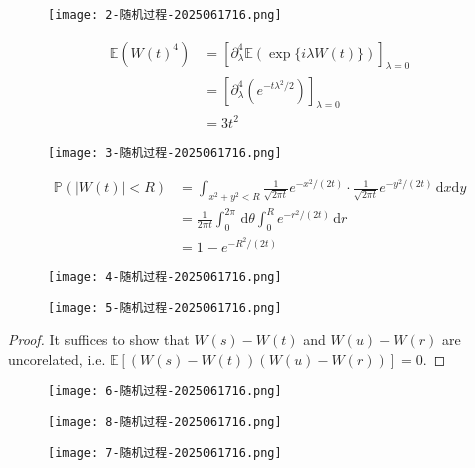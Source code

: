 \begin{figure}[H]
\centering
\texttt{[image: 2-随机过程-2025061716.png]}
\label{}
\end{figure}
\[
\begin{aligned}
\mathbb{E}(W(t)^{4}) & =[\partial^{4}_{\lambda}\mathbb{E}(\exp \{ i\lambda W(t) \})]_{\lambda=0} \\
 & =[\partial^{4}_{\lambda}(e^{ -t\lambda^{2}/2  }) ]_{\lambda=0} \\
 & =3 t^2
\end{aligned}
\]
\begin{figure}[H]
\centering
\texttt{[image: 3-随机过程-2025061716.png]}
\label{}
\end{figure}
\[
\begin{aligned}
\mathbb{P}(\lvert W(t) \rvert <R) & =\int_{x^{2}+y^{2}<R}^{} \frac{1}{\sqrt{ 2\pi t }}e^{ -x^{2}/(2t) }\cdot\frac{1}{\sqrt{ 2\pi t }}e^{ -y^{2}/(2t) }  \, \mathrm{d}x\mathrm{d}y \\
 & =\frac{1}{2\pi t}\int_{0}^{2\pi}  \, \mathrm{d}\theta \int_{0}^{R} e^{ -r^{2}/(2t) } \, \mathrm{d}r \\
 & =1-e^{ -R^{2}/(2t) }
\end{aligned}
\]
\begin{figure}[H]
\centering
\texttt{[image: 4-随机过程-2025061716.png]}
\label{}
\end{figure}

\begin{figure}[H]
\centering
\texttt{[image: 5-随机过程-2025061716.png]}
\label{}
\end{figure}

\begin{proof}
It suffices to show that $W(s)-W(t)$ and $W(u)-W(r)$ are uncorelated, i.e. $\mathbb{E}[(W(s)-W(t))(W(u)-W(r))]=0$.
\end{proof}

\begin{figure}[H]
\centering
\texttt{[image: 6-随机过程-2025061716.png]}
\label{}
\end{figure}

\begin{figure}[H]
\centering
\texttt{[image: 8-随机过程-2025061716.png]}
\label{}
\end{figure}
\begin{figure}[H]
\centering
\texttt{[image: 7-随机过程-2025061716.png]}
\label{}
\end{figure}

